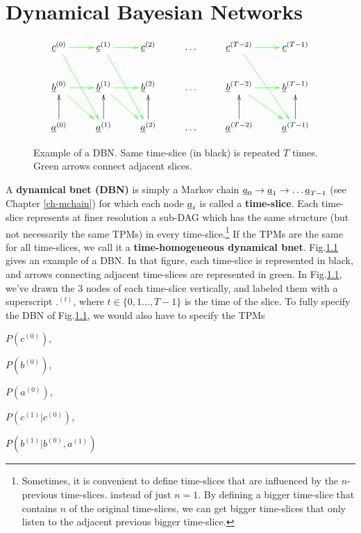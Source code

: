 \chapter{Dynamical Bayesian Networks}
\label{ch-dyn-bnets}

\begin{figure}[h!]
$$
\xymatrix{
\rvc^{(0)}\ar@[green][r]\ar@[green][rdd]
&\rvc^{(1)}\ar@[green][r]\ar@[green][rdd]
&\rvc^{(2)}
&\ldots
&\rvc^{(T-2)}\ar@[green][r]\ar@[green][rdd]
&\rvc^{(T-1)}
\\
\rvb^{(0)}\ar@[green][rd]\ar@[green][r]
&\rvb^{(1)}\ar@[green][rd]\ar@[green][r]
&\rvb^{(2)}
&\ldots
&\rvb^{(T-2)}\ar@[green][rd]\ar@[green][r]
&\rvb^{(T-1)}
\\
\rva^{(0)}\ar[u]
&\rva^{(1)}\ar[u]
&\rva^{(2)}\ar[u]
&\ldots
&\rva^{(T-2)}\ar[u]
&\rva^{(T-1)}\ar[u]
}$$
\caption{
Example of a DBN. Same
time-slice (in black) is repeated $T$ times.
Green arrows connect adjacent slices.
}
\label{fig-dyn-bnet}
\end{figure}



A {\bf dynamical bnet (DBN)} is simply
a Markov chain ${\underline{a}}_0\rightarrow {\underline{a}}_1\rightarrow\ldots {\underline{a}}_{T-1}$ (see Chapter
\ref{ch-mchain})
for which each node ${\underline{a}}_i$ is 
called a {\bf time-slice}.
Each time-slice 
represents
at finer resolution a sub-DAG
which has the same 
structure (but
not necessarily the same TPMs)
in every time-slice.\footnote{Sometimes,
it is convenient to
define time-slices that are influenced by
the $n$-previous time-slices.
instead of just $n=1$.
By defining a bigger time-slice that contains
$n$ of the original time-slices,
we can get bigger time-slices
that only listen to 
the adjacent previous bigger time-slice.}
 If the
TPMs are the same for all time-slices,
we call it a {\bf time-homogeneous dynamical bnet}.
Fig.\ref{fig-dyn-bnet} gives an example
of a DBN.
In that figure, each time-slice
is represented in black, and
arrows connecting adjacent time-slices
are represented in green.
In Fig.\ref{fig-dyn-bnet},
we've drawn the 3 nodes of
each time-slice vertically,
and labeled them
with a superscript ${.}^{(t)}$,
where $t\in \{
0,1 \ldots, T-1\}$ 
is the time
of the slice.
To fully 
specify the
DBN
of Fig.\ref{fig-dyn-bnet},
we would also have to specify
the TPMs 

$P(c^{(0)})$, 

$P(b^{(0)})$,

$P(a^{(0)})$,

$P(c^{(1)}|c^{(0)})$,
 
$P(b^{(1)}|b^{(0)}, a^{(1)})$

